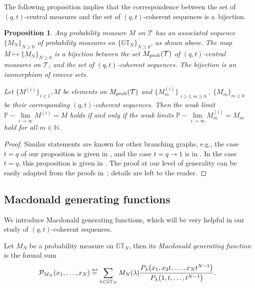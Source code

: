 \documentclass[pdftex]{sigma}
\numberwithin{equation}{section}
\newcommand\myeq{\mathrel{\stackrel{\makebox[0pt]{\mbox{\normalfont\tiny def}}}{=}}}
\newtheorem{prop}[thm]{Proposition}
\newcommand{\N}{\mathbb{N}}
\newcommand{\GT}{\mathbb{GT}}
\newcommand{\PPP}{\mathcal{P}}
\newcommand{\Tau}{\mathcal{T}}
\begin{document}
The following proposition implies that the correspondence between the set of $(q, t)$-central measures and the set of $(q, t)$-coherent sequences is a~bijection.

\begin{prop}\label{prop:bijection}
Any probability measure $M$ on $\Tau$ has an associated sequence $\{M_N\}_{N\geq 0}$ of probability measures on $\{\GT_N\}_{N\geq 0}$, as shown above. The map $M\mapsto\{M_N\}_{N\geq 0}$ is a bijection between the set $M_{\rm prob}(\Tau)$ of $(q, t)$-central measures on $\Tau$, and the set of $(q, t)$-coherent sequences. The bijection is an isomorphism of convex sets.

Let $\big\{M^{(i)}\big\}_{i\geq 1}, M$ be elements on $M_{\rm prob}(\Tau)$ and $\big\{M^{(i)}_m\big\}_{\substack{i \geq 1, m\geq 0}}$, $\{M_m\}_{m\geq 0}$ be their correspon\-ding $(q, t)$-coherent sequences. Then the weak limit $\mathbb{P}-\lim\limits_{i\rightarrow\infty}{M^{(i)}} = M$ holds if and only if the weak limits $\mathbb{P}-\lim\limits_{i\rightarrow\infty}{M^{(i)}_m} = M_m$ hold for all $m\in\N$.
\end{prop}
\begin{proof}
Similar statements are known for other branching graphs, e.g., the case $t = q$ of our proposition is given in \cite[Propositions~4.4 and~4.9]{G}, and the case $t = q \rightarrow 1$ is in \cite[Proposition~10.3]{Ol1}.
In the case $t = q$, this proposition is given in \cite[Propositions~4.4 and~4.9]{G}.
The proof at our level of generality can be easily adapted from the proofs in~\cite{G}; details are left to the reader.
\end{proof}

\subsection{Macdonald generating functions}\label{sec:generating}


We introduce Macdonald generating functions, which will be very helpful in our study of $(q, t)$-coherent sequences.

\begin{df}
Let $M_N$ be a probability measure on $\GT_N$, then its \textit{Macdonald generating function} is the formal sum
\begin{gather*}
\PPP_{M_N}(x_1, \dots, x_N) \myeq \sum_{\lambda\in\GT_N}{M_N(\lambda)\frac{P_{\lambda}\big(x_1, x_2t, \dots, x_Nt^{N-1}\big)}{P_{\lambda}\big(1, t, \dots, t^{N-1}\big)}}.
\end{gather*}
\end{df}
\end{document}
